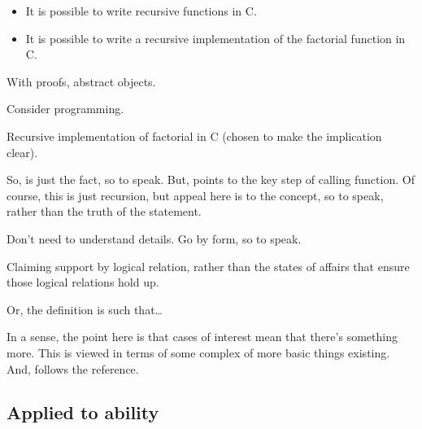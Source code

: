 \begin{note}

  \begin{illustration}\label{ill:ad:factorial}
    \mbox{}
    \vspace{-\baselineskip}
    \begin{itemize}
    \item It is possible to write recursive functions in C.
    \item It is possible to write a recursive implementation of the factorial function in C.
    \end{itemize}
  \end{illustration}
  With proofs, abstract objects.

  Consider programming.

  Recursive implementation of factorial in C (chosen to make the implication clear).

  So, \adA{} is just the fact, so to speak.
  But, \adB{} points to the key step of calling function.
  Of course, this is just recursion, but appeal here is to the concept, so to speak, rather than the truth of the statement.

  Don't need to understand details.
  Go by form, so to speak.

  Claiming support by logical relation, rather than the states of affairs that ensure those logical relations hold up.

  Or, the definition is such that\dots
\end{note}

\begin{note}[Existentials]
  In a sense, the point here is that \adA{} cases of interest mean that there's something more.
  This is viewed in terms of some complex of more basic things existing.
  And, \adB{} follows the reference.
\end{note}

\subsection{Applied to ability}
\label{sec:applied-ability}

\subsubsection{\adA{}}
\label{sec:ads}

\subsubsection{\adB{}}
\label{sec:adc}

